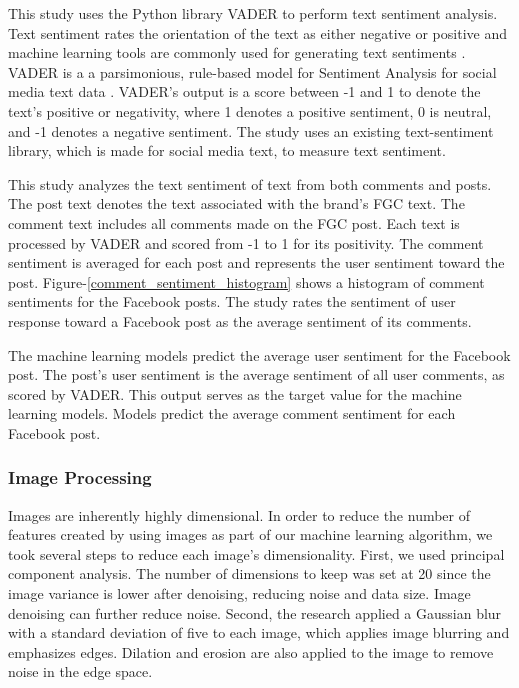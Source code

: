 \documentclass{article}
\begin{document}
This study uses the Python library VADER to perform text sentiment analysis. Text sentiment rates the orientation of the text as either negative or positive and machine learning tools are commonly used for generating text sentiments \cite{HADDI201326}.  VADER is a a parsimonious, rule-based model for Sentiment Analysis for social media text data \cite{Gilbert}. VADER's output is a score between -1 and 1 to denote the text's positive or negativity, where 1 denotes a positive sentiment, 0 is neutral, and -1 denotes a negative sentiment. The study uses an existing text-sentiment library, which is made for social media text, to measure text sentiment.

This study analyzes the text sentiment of text from both comments and posts. The post text denotes the text associated with the brand's FGC text. The comment text includes all comments made on the FGC post. Each text is processed by VADER and scored from -1 to 1 for its positivity. The comment sentiment is averaged for each post and represents the user sentiment toward the post. Figure-\ref{comment_sentiment_histogram} shows a histogram of comment sentiments for the Facebook posts. The study rates the sentiment of user response toward a Facebook post as the average sentiment of its comments.

The machine learning models predict the average user sentiment for the Facebook post. The post's user sentiment is the average sentiment of all user comments, as scored by VADER. This output serves as the target value for the machine learning models. Models predict the average comment sentiment for each Facebook post.

\subsubsection{Image Processing}
Images are inherently highly dimensional. In order to reduce the number of features created by using images as part of our machine learning algorithm, we took several steps to reduce each image's dimensionality. First, we used principal component analysis. The number of dimensions to keep was set at 20 since the image variance is lower after denoising, reducing noise and data size. Image denoising can further reduce noise. Second, the research applied a Gaussian blur with a standard deviation of five to each image, which applies image blurring and emphasizes edges. Dilation and erosion are also applied to the image to remove noise in the edge space.
\end{document}
